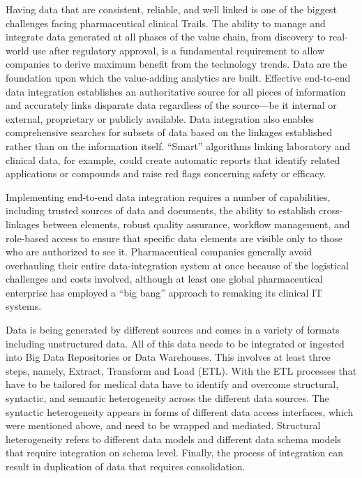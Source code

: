 \documentclass[sigconf]{acmart}
\begin{document}
Having data that are consistent, reliable, and well linked is one of the biggest challenges facing pharmaceutical clinical Trails. The ability to manage and integrate data generated at all phases of the value chain, from discovery to real-world use after regulatory approval, is a fundamental requirement to allow companies to derive maximum benefit from the technology trends. Data are the foundation upon which the value-adding analytics are built. Effective end-to-end data integration establishes an authoritative source for all pieces of information and accurately links disparate data regardless of the source—be it internal or external, proprietary or publicly available. Data integration also enables comprehensive searches for subsets of data based on the linkages established rather than on the information itself. “Smart” algorithms linking laboratory and clinical data, for example, could create automatic reports that identify related applications or compounds and raise red flags concerning safety or efficacy.

Implementing end-to-end data integration requires a number of capabilities, including trusted sources of data and documents, the ability to establish cross-linkages between elements, robust quality assurance, workflow management, and role-based access to ensure that specific data elements are visible only to those who are authorized to see it. Pharmaceutical companies generally avoid overhauling their entire data-integration system at once because of the logistical challenges and costs involved, although at least one global pharmaceutical enterprise has employed a “big bang” approach to remaking its clinical IT systems.

Data is being generated by different sources and comes in a variety of formats including unstructured
data. All of this data needs to be integrated or ingested into Big Data Repositories or Data Warehouses.
This involves at least three steps, namely, Extract, Transform and Load (ETL). With the ETL processes
that have to be tailored for medical data have to identify and overcome structural, syntactic, and
semantic heterogeneity across the different data sources. The syntactic heterogeneity appears in
forms of different data access interfaces, which were mentioned above, and need to be wrapped and
mediated. Structural heterogeneity refers to different data models and different data schema models
that require integration on schema level. Finally, the process of integration can result in duplication of
data that requires consolidation.
\end{document}
